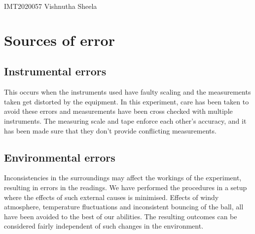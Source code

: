 \documentclass{article}
\begin{document}
\begin{sloppypar}
{%
\noindent{}
\begin{center}
   IMT2020057 Vishnutha Sheela
\end{center}





\section{Sources of error}
\subsection{Instrumental errors}
 This occurs when the instruments used have faulty scaling and the measurements taken get distorted by the equipment. In this experiment, care has been taken to avoid these errors and measurements have been cross checked with multiple instruments. The measuring scale and tape enforce each other's accuracy, and it has been made sure that they don't provide conflicting measurements.
\subsection{Environmental errors}
Inconsistencies in the surroundings may affect the workings of the experiment, resulting in errors in the readings. We have performed the procedures in a setup where the effects of such external causes is minimised. Effects of windy atmosphere, temperature fluctuations and inconsistent bouncing of the ball, all have been avoided to the best of our abilities. The resulting outcomes can be considered fairly independent of such changes in the environment.
}
\end{sloppypar}
\end{document}

